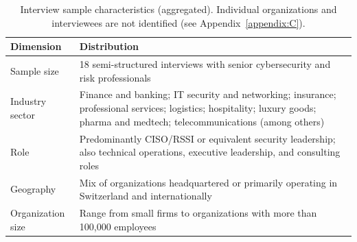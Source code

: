 \begin{table}[H]
    \centering
    \singlespacing
    \small
    \caption{Interview sample characteristics (aggregated). Individual organizations and interviewees are not identified (see Appendix~\ref{appendix:C}).}
    \label{tab:RotaSample}
    \begin{tabular}{p{} p{}}
        \toprule
        \textbf{Dimension} & \textbf{Distribution} \\
        \midrule
        Sample size &
        18 semi-structured interviews with senior cybersecurity and risk professionals \\
        Industry sector &
        Finance and banking; IT security and networking; insurance; professional services; logistics; hospitality; luxury goods; pharma and medtech; telecommunications (among others) \\
        Role &
        Predominantly CISO/RSSI or equivalent security leadership; also technical operations, executive leadership, and consulting roles \\
        Geography &
        Mix of organizations headquartered or primarily operating in Switzerland and internationally \\
        Organization size &
        Range from small firms to organizations with more than 100,000 employees \\
        \bottomrule
    \end{tabular}
\end{table}
